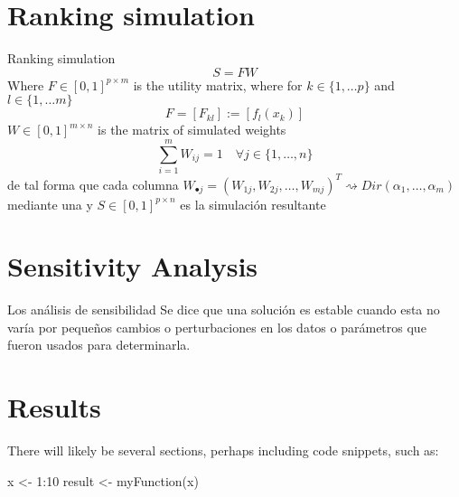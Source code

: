 \section{Ranking simulation}
Ranking simulation
\[ S = F W \]
Where $F\in[0,1]^{p\times m}$ is the utility matrix, where for $k\in\{1,\ldots p\}$ and
$l\in\{1,\ldots m\}$
\[ F = [F_{kl}] := [f_l(x_k)] \]
$W\in[0,1]^{m\times n}$ is the matrix of simulated weights
\[ \sum_{i=1}^m W_{ij} = 1 \quad \forall j\in\{1,\ldots,n\}\]
de tal forma que cada columna $W_{\bullet j} = (W_{1j},W_{2j},\ldots,W_{mj})^T\rightsquigarrow
Dir(\alpha_1,\ldots,\alpha_m)$ mediante una
y $S\in[0,1]^{p\times n}$ es la simulación resultante


\section{Sensitivity Analysis}
Los análisis de sensibilidad
Se dice que una solución es estable cuando esta no varía por pequeños cambios o perturbaciones en
los datos o parámetros que fueron usados para determinarla\citep{2}.


\section{Results}

There will likely be several sections, perhaps including code snippets, such as:

\begin{example}
  x <- 1:10
  result <- myFunction(x)
\end{example}


